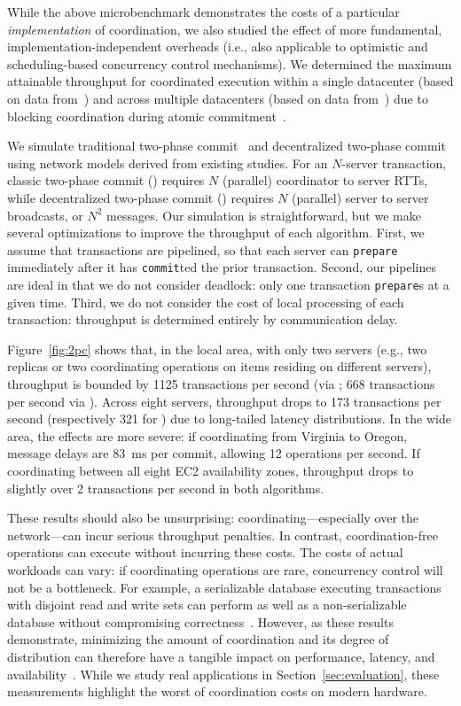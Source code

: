 While the above microbenchmark demonstrates the costs of a particular
\textit{implementation} of coordination, we also studied the
effect of more fundamental, implementation-independent overheads
(i.e., also applicable to optimistic and scheduling-based concurrency
control mechanisms). We determined the maximum attainable throughput
for coordinated execution within a single datacenter (based on data
from~\cite{bobtail}) and across multiple datacenters (based on data
from~\cite{hat-vldb}) due to blocking coordination during atomic
commitment~\cite{bernstein-book}. 

We simulate traditional two-phase commit~\cite{bernstein-book} and
decentralized two-phase commit~\cite{paxos-commit} using network
models derived from existing studies. For an $N$-server transaction,
classic two-phase commit (\cpc) requires $N$ (parallel) coordinator to
server RTTs, while decentralized two-phase commit (\dpc) requires $N$
(parallel) server to server broadcasts, or $N^2$ messages. Our
simulation is straightforward, but we make several
optimizations to improve the throughput of each algorithm. First, we
assume that transactions are pipelined, so that each server can
\texttt{prepare} immediately after it has \texttt{commit}ted the prior
transaction. Second, our pipelines are ideal in that we do not
consider deadlock: only one transaction \texttt{prepare}s at a given
time. Third, we do not consider the cost of local processing of each
transaction: throughput is determined entirely by communication delay.

Figure~\ref{fig:2pc} shows that, in the local area, with only two
servers (e.g., two replicas or two coordinating operations on items
residing on different servers), throughput is bounded by 1125
transactions per second (via \dpc; 668 transactions per second via
\cpc). Across eight servers, \dpc throughput drops to 173 transactions
per second (respectively 321 for \cpc) due to long-tailed latency
distributions. In the wide area, the effects are more severe: if
coordinating from Virginia to Oregon, \dpc message delays are 83~ms
per commit, allowing 12 operations per second. If coordinating between
all eight EC2 availability zones, throughput drops to slightly over 2
transactions per second in both algorithms.

These results should also be unsurprising: coordinating---especially over
the network---can incur serious throughput penalties. In contrast,
coordination-free operations can execute without incurring these
costs. The costs of actual workloads can vary: if coordinating
operations are rare, concurrency control will not be a bottleneck. For
example, a serializable database executing transactions with disjoint
read and write sets can perform as well as a non-serializable database
without compromising correctness~\cite{shore-communication}. However,
as these results demonstrate, minimizing the amount of coordination
and its degree of distribution can therefore have a tangible impact on
performance, latency, and
availability~\cite{pacelc,hat-vldb,gilbert-cap}. While we study real
applications in Section~\ref{sec:evaluation}, these measurements
highlight the worst of coordination costs on modern hardware.

